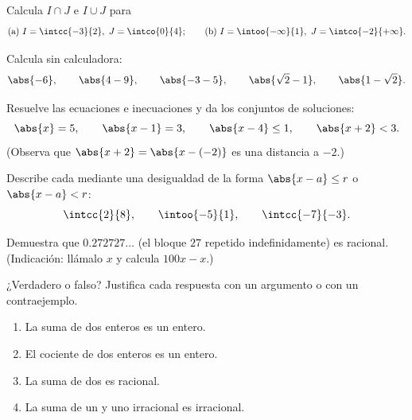 \begin{exercise}[$\star$]\label{exo:g10:numbers:3}
Calcula $I \cap J$ e $I \cup J$ para
\[
\text{(a) } I = \intcc{-3}{2},\ J = \intco{0}{4};
\qquad
\text{(b) } I = \intoo{-\infty}{1},\ J = \intco{-2}{+\infty}.
\]
\end{exercise}

\begin{exercise}[$\star$]\label{exo:g10:numbers:4}
Calcula sin calculadora:
\[
\abs{-6}, \qquad \abs{4 - 9}, \qquad \abs{-3 - 5}, \qquad
\abs{\sqrt 2 - 1}, \qquad \abs{1 - \sqrt 2}.
\]
\end{exercise}

\begin{exercise}[$\star$]\label{exo:g10:numbers:5}
Resuelve las ecuaciones e inecuaciones y da los conjuntos de soluciones:
\[
\abs{x} = 5, \qquad \abs{x - 1} = 3, \qquad \abs{x - 4} \leq 1, \qquad
\abs{x + 2} < 3 .
\]
(Observa que $\abs{x+2} = \abs{x - (-2)}$ es una distancia a $-2$.)
\end{exercise}

\begin{exercise}[$\star\star$]\label{exo:g10:numbers:6}
Describe cada  mediante una desigualdad de la forma
$\abs{x - a} \leq r$ o $\abs{x - a} < r$:
\[
\intcc{2}{8}, \qquad \intoo{-5}{1}, \qquad \intcc{-7}{-3}.
\]
\end{exercise}

\begin{exercise}[$\star\star$]\label{exo:g10:numbers:7}
Demuestra que $0.272727\dots$ (el bloque $27$ repetido indefinidamente) es
racional. (Indicación: llámalo $x$ y calcula $100x - x$.)
\end{exercise}

\begin{exercise}[$\star\star$]\label{exo:g10:numbers:8}
¿Verdadero o falso? Justifica cada respuesta con un argumento o con un
contraejemplo.
\begin{enumerate}
  \item La suma de dos enteros es un entero.
  \item El cociente de dos enteros es un entero.
  \item La suma de dos  es racional.
  \item La suma de un  y uno irracional es irracional.
\end{enumerate}
\end{exercise}

